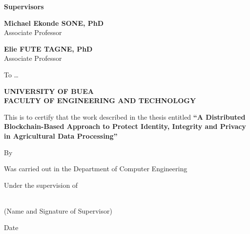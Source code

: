 \documentclass[12pt,a4paper,oneside]{book}
\begin{document}
\begin{singlespace}
\noindent\textbf{Supervisors}

\vspace{1.0\baselineskip}

\noindent\textbf{Michael Ekonde SONE, PhD}\\
Associate Professor

\vspace{0.8\baselineskip}

\noindent\textbf{Elie FUTE TAGNE, PhD}\\
Associate Professor

\vfill

\begin{center}
  \textbf{\monthyear}
\end{center}

\vspace{1.5\baselineskip}

\end{singlespace}
\clearpage
 

\setcounter{page}{2}                     

\begin{ubonehalfspace}
\vspace{2\baselineskip}
\begin{center}
To \dots
\end{center}
\clearpage
 \end{ubonehalfspace}
\begin{singlespace}
\vspace{\baselineskip}
\begin{center}{\bfseries UNIVERSITY OF BUEA}\\
{\bfseries FACULTY OF ENGINEERING AND TECHNOLOGY}\end{center}
\vspace{2\baselineskip}

This is to certify that the work described in the thesis entitled
\textbf{``A Distributed Blockchain-Based Approach to Protect Identity,
Integrity and Privacy in Agricultural Data Processing''}

\vspace{\baselineskip}
By \hrulefill

\vspace{\baselineskip}
Was carried out in the Department of Computer Engineering

\vspace{\baselineskip}
Under the supervision of

\vspace{2\baselineskip}
\hrulefill\\
(Name and Signature of Supervisor)

\vspace{2\baselineskip}
Date \hrulefill
\end{singlespace}
\clearpage
 \begin{ubonehalfspace}

\clearpage
 \end{ubonehalfspace}
\begin{ubonehalfspace}

\clearpage
 \end{ubonehalfspace}
\end{document}
